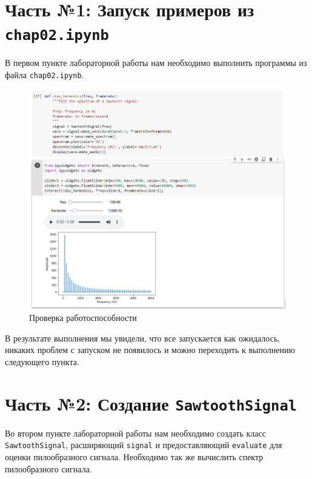 \documentclass[a4paper]{article}
\begin{document}
    \newpage
        \section{Часть №1: Запуск примеров из \texttt{chap02.ipynb}}
            В первом пункте лабораторной работы нам необходимо выполнить программы из файла \texttt{chap02.ipynb}. 
            
             \begin{figure}[h]
                \centering
                \includegraphics[width=\textwidth]{ex_1_all_work.png}
                \caption{Проверка работоспособности}
                \label{fig:check_it_works}
            \end{figure}
            
            В результате выполнения мы увидели, что все запускается как ожидалось, никаких проблем с запуском не появилось и можно переходить к выполнению следующего пункта.
    
    \newpage
        \section{Часть №2: Создание \texttt{SawtoothSignal}}
            Во втором пункте лабораторной работы нам необходимо создать класс \texttt{SawtoothSignal}, расширяющий \texttt{signal} и предоставляющий \texttt{evaluate} для оценки пилообразного сигнала. Необходимо так же вычислить спектр пилообразного сигнала.
            
\end{document}
